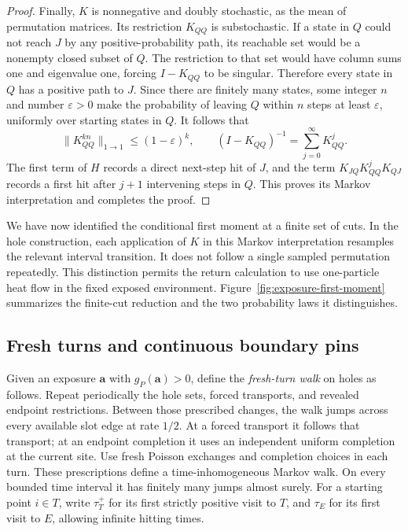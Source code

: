 \begin{proof}
Finally, \(K\) is nonnegative and doubly stochastic, as the mean of
permutation matrices.  Its restriction \(K_{QQ}\) is substochastic.
If a state in \(Q\) could not reach \(J\) by any positive-probability
path, its reachable set would be a nonempty closed subset of \(Q\).
The restriction to that set would have column sums one and eigenvalue
one, forcing \(I-K_{QQ}\) to be singular.  Therefore every state in
\(Q\) has a positive path to \(J\).  Since there are finitely many
states, some integer \(n\) and number \(\varepsilon>0\) make the
probability of leaving \(Q\) within \(n\) steps at least
\(\varepsilon\), uniformly over starting states in \(Q\).  It
follows that
\[
 \|K_{QQ}^{kn}\|_{1\to1}\le(1-\varepsilon)^k,
 \qquad
 (I-K_{QQ})^{-1}=\sum_{j=0}^{\infty}K_{QQ}^j.
\]
The first term of \(H\) records a direct next-step hit of \(J\),
and the term \(K_{JQ}K_{QQ}^jK_{QJ}\) records a first hit after
\(j+1\) intervening steps in \(Q\).  This proves its Markov
interpretation and completes the proof.
\end{proof}

We have now identified the conditional first moment at a finite set of
cuts.  In the hole construction, each application of \(K\) in this
Markov interpretation resamples the relevant interval transition.
It does not follow a single sampled permutation repeatedly.  This
distinction permits the return calculation to use one-particle heat
flow in the fixed exposed environment.  Figure~\ref{fig:exposure-first-moment}
summarizes the finite-cut reduction and the two probability laws it
distinguishes.


\FloatBarrier

\subsection{Fresh turns and continuous boundary pins}

Given an exposure \(\mathbf a\) with \(g_P(\mathbf a)>0\), define
the \emph{fresh-turn walk} on holes as follows.  Repeat periodically the
hole sets, forced transports, and revealed endpoint restrictions.
Between those prescribed changes, the walk jumps across every available
slot edge at rate \(1/2\).  At a forced transport it follows that
transport; at an endpoint completion it uses an independent uniform
completion at the current site.  Use fresh Poisson exchanges and
completion choices in each turn.  These prescriptions define a
time-inhomogeneous Markov walk.  On every bounded time interval it has
finitely many jumps almost surely.  For a starting point \(i\in T\),
write \(\tau_T^+\) for its first strictly positive visit to \(T\),
and \(\tau_E\) for its first visit to \(E\), allowing infinite
hitting times.

